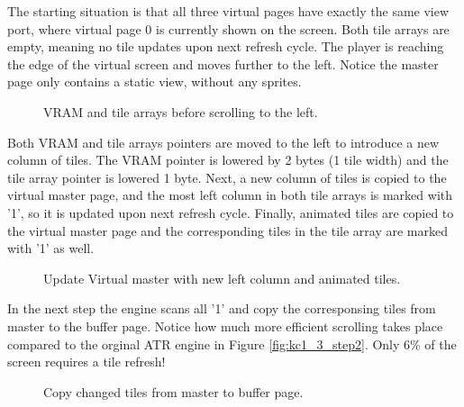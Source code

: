 \documentclass[book.tex]{subfiles}
\begin{document}
\vspace{0.5cm}
\par
\begin{minipage}{\textwidth}
  
\end{minipage}
\label{state_type}


\pagebreak

The starting situation is that all three virtual pages have exactly the same view port, where virtual page 0 is currently shown on the screen. Both tile arrays are empty, meaning no tile updates upon next refresh cycle. The player is reaching the edge of the virtual screen and moves further to the left. Notice the master page only contains a static view, without any sprites. 

\begin{figure}[H]
\centering
 \caption{VRAM and tile arrays before scrolling to the left.}
 \label{fig:kc4_6_step0}
\end{figure}

\pagebreak

Both VRAM and tile arrays pointers are moved to the left to introduce a new column of tiles. The VRAM pointer is lowered by 2 bytes (1 tile width) and the tile array pointer is lowered 1 byte. Next, a new column of tiles is copied to the virtual master page, and the most left column in both tile arrays is marked with '1', so it is updated upon next refresh cycle. Finally, animated tiles are copied to the virtual master page and the corresponding tiles in the tile array are marked with '1' as well.

\begin{figure}[H]
\centering
 \caption{Update Virtual master with new left column and animated tiles.}
 \label{fig:kc4_6_step1}
\end{figure}

\pagebreak

In the next step the engine scans all '1' and copy the corresponsing tiles from master to the buffer page. Notice how much more efficient scrolling takes place compared to the orginal ATR engine in Figure \ref{fig:kc1_3_step2}. Only 6\% of the screen requires a tile refresh! 

\begin{figure}[H]
\centering
 \caption{Copy changed tiles from master to buffer page.}
 \label{fig:kc4_6_step2}
\end{figure}
\end{document}
